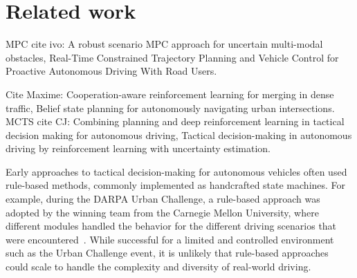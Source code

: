 \chapter{Related work}\label{chapter:related_work}

MPC cite ivo:
A robust scenario MPC approach for uncertain multi-modal obstacles,
Real-Time Constrained Trajectory Planning and Vehicle Control for Proactive Autonomous Driving With Road Users.

Cite Maxime: 
Cooperation-aware reinforcement learning for merging in dense traffic, 
Belief state planning for autonomously navigating urban intersections.
MCTS cite CJ:
Combining planning and deep reinforcement learning in tactical decision making for autonomous driving,
Tactical decision-making in autonomous driving by reinforcement learning with uncertainty estimation.


Early approaches to tactical decision-making for autonomous vehicles often used rule-based methods, commonly implemented as handcrafted state machines. For example, during the DARPA Urban Challenge, a rule-based approach was adopted by the winning team from the Carnegie Mellon University, where different modules handled the behavior for the different driving scenarios that were encountered~\cite{darpaCMU}. 
While successful for a limited and controlled environment such as the Urban Challenge event, it is unlikely that rule-based approaches could scale to handle the complexity and diversity of real-world driving.

